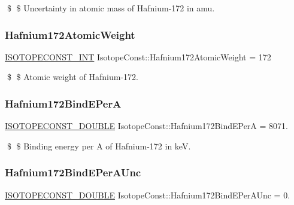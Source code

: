 \$ \$ Uncertainty in atomic mass of Hafnium-\/172 in amu. \mbox{\label{group___isotope_const-_hafnium-_hf172_ga9f8af1d0d195cbe6535068dd37ada879}} 
\subsubsection{\texorpdfstring{Hafnium172\+Atomic\+Weight}{Hafnium172AtomicWeight}}
{\footnotesize\ttfamily \mbox{\hyperlink{group___isotope_const-_macros_ga5f18360b3e99483a35c32d789e62621c}{I\+S\+O\+T\+O\+P\+E\+C\+O\+N\+S\+T\+\_\+\+I\+NT}} Isotope\+Const\+::\+Hafnium172\+Atomic\+Weight = 172}

\$ \$ Atomic weight of Hafnium-\/172. \mbox{\label{group___isotope_const-_hafnium-_hf172_gab48e6d7ec8e803a854ff90eecdf73a4c}} 
\subsubsection{\texorpdfstring{Hafnium172\+Bind\+E\+PerA}{Hafnium172BindEPerA}}
{\footnotesize\ttfamily \mbox{\hyperlink{group___isotope_const-_macros_ga8f45a7272ce02c0b4c65c44636ed719a}{I\+S\+O\+T\+O\+P\+E\+C\+O\+N\+S\+T\+\_\+\+D\+O\+U\+B\+LE}} Isotope\+Const\+::\+Hafnium172\+Bind\+E\+PerA = 8071.}

\$ \$ Binding energy per A of Hafnium-\/172 in keV. \mbox{\label{group___isotope_const-_hafnium-_hf172_ga43dfa4de6fdb45c6102a0fab1935019b}} 
\subsubsection{\texorpdfstring{Hafnium172\+Bind\+E\+Per\+A\+Unc}{Hafnium172BindEPerAUnc}}
{\footnotesize\ttfamily \mbox{\hyperlink{group___isotope_const-_macros_ga8f45a7272ce02c0b4c65c44636ed719a}{I\+S\+O\+T\+O\+P\+E\+C\+O\+N\+S\+T\+\_\+\+D\+O\+U\+B\+LE}} Isotope\+Const\+::\+Hafnium172\+Bind\+E\+Per\+A\+Unc = 0.}

